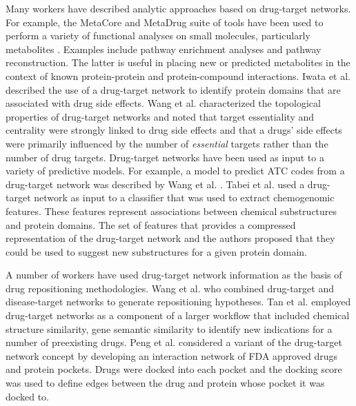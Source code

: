 \documentclass[]{book}
\begin{document}
Many workers have described analytic approaches based on drug-target
networks. For example, the MetaCore and MetaDrug suite of tools have
been used to perform a variety of functional analyses on small
molecules, particularly metabolites \cite{Brennan:2009kx}.  Examples
include pathway enrichment analyses and pathway reconstruction. The
latter is useful in placing new or predicted metabolites in the
context of known protein-protein and protein-compound
interactions. Iwata et al. \cite{Iwata:2013lk} described the use of a
drug-target network to identify protein domains that are associated
with drug side effects. Wang et al. \cite{Wang:2013gn} characterized
the topological properties of drug-target networks and noted that
target essentiality and centrality were strongly linked to drug side
effects and that a drugs' side effects were primarily influenced by
the number of \emph{essential} targets rather than the number of drug
targets. Drug-target networks have been used as input to a variety of
predictive models. For example, a model to predict ATC codes from a
drug-target network was described by Wang et al. 
\cite{Wang:2013ye}. Tabei et al. \cite{Tabei:2012tn} used a drug-target
network as input to a classifier that was used to extract chemogenomic
features. These features represent associations between chemical
substructures and protein domains. The set of features that provides a
compressed representation of the drug-target network and the authors
proposed that they could be used to suggest new substructures for a
given protein domain. 

A number of workers have used drug-target network information as the
basis of drug repositioning methodologies. Wang et al.
\cite{Wang:2014lp} who combined drug-target and disease-target
networks to generate repositioning hypotheses. Tan et al. 
\cite{Tan:2014qb} employed drug-target networks as a component of a
larger workflow that included chemical structure similarity, gene
semantic similarity to identify new indications for a number of
preexisting drugs.  Peng et al. \cite{Peng:2014vy} considered a
variant of the drug-target network concept by developing an
interaction network of FDA approved drugs and protein pockets. Drugs
were docked into each pocket and the docking score was used to define
edges between the drug and protein whose pocket it was docked to.
\end{document}

